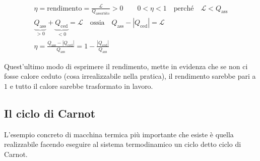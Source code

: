 \begin{gather*}
	\eta = \text{rendimento} = \frac{\mathcal{L} }{Q_{\text{assorbito} } } > 0 \qquad 0 < \eta < 1 \quad \text{perché} \quad \mathcal{L} < Q_{\text{ass} } \\
	\underbrace{Q_{\text{ass}}}_{>0} + \underbrace{Q_{\text{ced}}}_{<0} = \mathcal{L} \quad \text{ossia} \quad Q_{\text{ass}} - |Q_{\text{ced}}| = \mathcal{L} \\
	\eta = \frac{Q_{\text{ass}} - |Q_{\text{ced}}|}{Q_{\text{ass}}} = 1 - \frac{|Q_{\text{ced}}|}{Q_{\text{ass}}}
\end{gather*}

Quest'ultimo modo di esprimere il rendimento, mette in evidenza che se non ci fosse calore ceduto (cosa irrealizzabile nella pratica), il rendimento sarebbe pari a $1$ e tutto il calore sarebbe trasformato in lavoro.

\subsection{Il ciclo di Carnot}

L'esempio concreto di macchina termica più importante che esiste è quella realizzabile facendo eseguire al sistema termodinamico un ciclo detto ciclo di Carnot.

